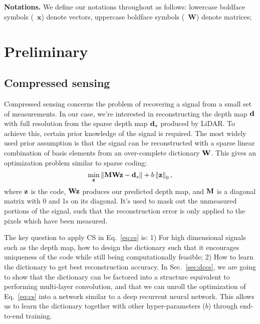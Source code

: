\\
\\
\noindent\textbf{Notations.} We define our notations throughout as follows: lowercase boldface symbols (\eg~$\mathbf{x}$) denote vectors, uppercase boldface symbols (\eg~$\mathbf{W}$) denote matrices;
 
\section{Preliminary}
\subsection{Compressed sensing}
Compressed sensing concerns the problem of recovering a signal from a small set of measurements. In our case, we're interested in reconstructing the depth map $\mathbf{d}$ with full resolution from the sparse depth map $\mathbf{d}_s$ produced by LiDAR. To achieve this, certain prior knowledge of the signal is required. The most widely used prior assumption is that the signal can be reconstructed with a sparse linear combination of basis elements from an over-complete dictionary $\mathbf{W}$. This gives an optimization problem similar to sparse coding:
\begin{equation}
    \min_{\mathbf{z}} \Vert \mathbf{M}\mathbf{W}\mathbf{z} - \mathbf{d}_s \Vert + b\left\Vert\mathbf{z}\right\Vert_0,
    \label{eq:cs}
\end{equation}
where $\mathbf{z}$ is the code, $\mathbf{W}\mathbf{z}$ produces our predicted depth map, and $\mathbf{M}$ is a diagonal matrix with 0 and 1s on its diagonal. It's used to mask out the unmeasured portions of the signal, such that the reconstruction error is only applied to the pixels which have been measured.

The key question to apply CS in Eq.~\ref{eq:cs} is: 1) For high dimensional signals such as the depth map, how to design the dictionary such that it encourages uniqueness of the code while still being computationally feasible; 2) How to learn the dictionary to get best reconstruction accuracy. In Sec.~\ref{sec:dccs}, we are going to show that the dictionary can be factored into a structure equivalent to performing multi-layer convolution, and that we can unroll the optimization of  Eq.~\ref{eq:cs} into a network similar to a deep recurrent neural network. This allows us to learn the dictionary together with other hyper-parameters (\eg $b$) through end-to-end training.

